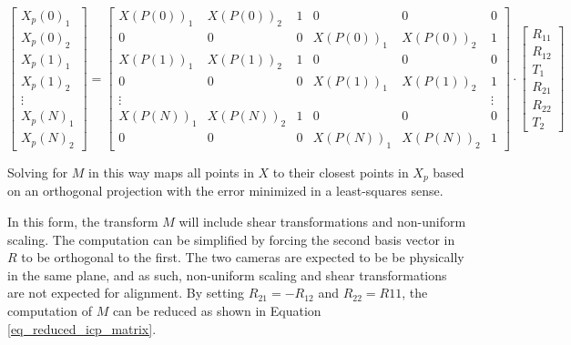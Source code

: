 \documentclass[sigconf]{acmart/acmart}
\begin{document}
\begin{equation}
\begin{bmatrix}
X_p(0)_1 \\
X_p(0)_2 \\
X_p(1)_1 \\
X_p(1)_2 \\
\vdots \\
X_p(N)_1 \\
X_p(N)_2
\end{bmatrix}
=
\begin{bmatrix}
X(P(0))_1 & X(P(0))_2 & 1 & 0 & 0 & 0 \\
0 & 0 & 0 & X(P(0))_1 & X(P(0))_2 & 1 \\
X(P(1))_1 & X(P(1))_2 & 1 & 0 & 0 & 0 \\
0 & 0 & 0 & X(P(1))_1 & X(P(1))_2 & 1 \\
\vdots & & & & & \vdots \\
X(P(N))_1 & X(P(N))_2 & 1 & 0 & 0 & 0 \\
0 & 0 & 0 & X(P(N))_1 & X(P(N))_2 & 1 
\end{bmatrix}
\cdot
\begin{bmatrix}
R_{11} \\
R_{12} \\
T_1 \\
R_{21} \\
R_{22} \\
T_2
\end{bmatrix}
\label{eq_full_icp_matrix}
\end{equation}

Solving for $M$ in this way maps all points in $X$ to their closest points in $X_p$ based on an orthogonal projection with the error minimized in a least-squares sense. 

In this form, the transform $M$ will include shear transformations and non-uniform scaling. The computation can be simplified by forcing the second basis vector in $R$ to be orthogonal to the first. The two cameras are expected to be be physically in the same plane, and as such, non-uniform scaling and shear transformations are not expected for alignment. By setting $R_{21} = -R_{12}$ and $R_{22} = R{11}$, the computation of $M$ can be reduced as shown in Equation \ref{eq_reduced_icp_matrix}.
\end{document}
